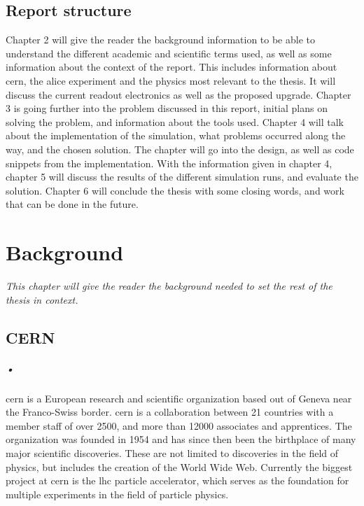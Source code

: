 \documentclass[a4paper, 12pt]{report}
\begin{document}
\section{Report structure}
Chapter 2 will give the reader the background information to be able to understand the different academic and scientific terms used, as well as some information about the context of the report.
This includes information about \gls{cern}, the \gls{alice} experiment and the physics most relevant to the thesis.
It will discuss the current readout electronics as well as the proposed upgrade.
Chapter 3 is going further into the problem discussed in this report, initial plans on solving the problem, and information about the tools used.
Chapter 4 will talk about the implementation of the simulation, what problems occurred along the way, and the chosen solution.
The chapter will go into the design, as well as code snippets from the implementation.
With the information given in chapter 4, chapter 5 will discuss the results of the different simulation runs, and evaluate the solution.
Chapter 6 will conclude the thesis with some closing words, and work that can be done in the future.


\chapter{Background}
\textit{This chapter will give the reader the background needed to set the rest of the thesis in context.}

\section{CERN}
\paragraph{•}
\gls{cern} is a European research and scientific organization based out of Geneva near the Franco-Swiss border\cite{cern}.
\gls{cern} is a collaboration between 21 countries with a member staff of over 2500, and more than 12000 associates and apprentices.
The organization was founded in 1954 and has since then been the birthplace of many major scientific discoveries.
These are not limited to discoveries in the field of physics, but includes the creation of the World Wide Web\cite{www}.
Currently the biggest project at \gls{cern} is the \gls{lhc} particle accelerator, which serves as the foundation for multiple experiments in the field of particle physics.
\end{document}
